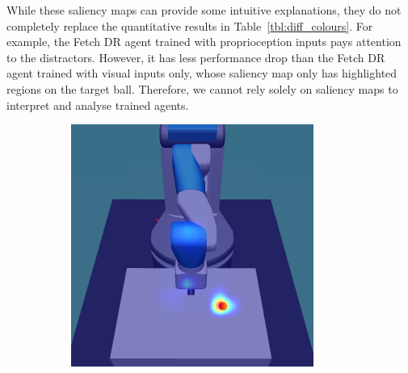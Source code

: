 While these saliency maps can provide some intuitive explanations, they do not completely replace the quantitative results in Table~\ref{tbl:diff_colours}. For example, the Fetch DR agent trained with proprioception inputs pays attention to the distractors. However, it has less performance drop than the Fetch DR agent trained with visual inputs only, whose saliency map only has highlighted regions on the target ball. Therefore, we cannot rely solely on saliency maps to interpret and analyse trained agents.

\begin{figure}[h!]
  \centering
  \begin{subfigure}{0.24\columnwidth}
    \includegraphics[width=\linewidth]{figures/chapter6/distractor_saliency_fetch_pro_off/standard_visual_std}
  \end{subfigure}
  \begin{subfigure}{0.24\columnwidth}

\end{subfigure}
\end{figure}
